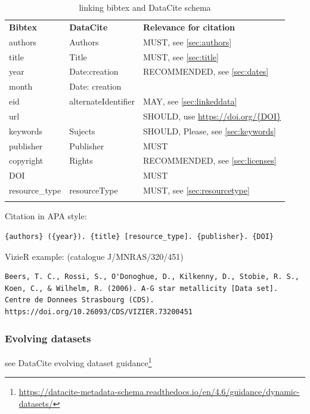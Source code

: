 \documentclass[11pt,a4paper]{ivoa}
\begin{document}
\begin{table}[th]
	\begin{tabular}{lll}
		\sptablerule
		\textbf{Bibtex} & \textbf{DataCite} & \textbf{Relevance for citation} \\
		\sptablerule
		\sptablerule
	authors & Authors & MUST, see \ref{sec:authors} \\
	title & Title & MUST, see \ref{sec:title}\\
	year &  Date:creation & RECOMMENDED, see \ref{sec:dates} \\
	month & Date: creation & \\
	eid & alternateIdentifier & MAY, see \ref{sec:linkeddata}\\
	url & & SHOULD, use \url{https://doi.org/{DOI}} \\
	keywords & Sujects & SHOULD, Please, see \ref{sec:keywords} \\
	publisher & Publisher & MUST \\
    copyright & Rights & RECOMMENDED, see \ref{sec:licenses} \\
    DOI & & MUST \\
    resource\_type  & resourceType & MUST, see \ref{sec:resourcetype}\\
    \sptablerule
	\end{tabular}%
\caption{\label{tab:astroDOIs1}linking bibtex and DataCite schema}
\end{table}

Citation in APA style:
\begin{verbatim}
{authors} ({year}). {title} [resource_type]. {publisher}. {DOI}
\end{verbatim}

VizieR example: (catalogue J/MNRAS/320/451)
\begin{verbatim}
Beers, T. C., Rossi, S., O'Donoghue, D., Kilkenny, D., Stobie, R. S.,
Koen, C., & Wilhelm, R. (2006). A-G star metallicity [Data set]. 
Centre de Donnees Strasbourg (CDS). https://doi.org/10.26093/CDS/VIZIER.73200451
\end{verbatim}

\subsubsection{Evolving datasets}

see DataCite evolving dataset guidance\footnote{\url{https://datacite-metadata-schema.readthedocs.io/en/4.6/guidance/dynamic-datasets/}}\\
\end{document}
